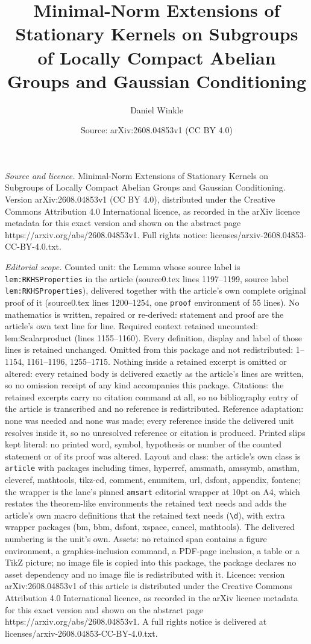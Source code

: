 \documentclass[10pt,a4paper]{amsart}
\title[Minimal-Norm Extensions of Stationary Kernels on Subgroups o]{Minimal-Norm Extensions of Stationary Kernels on Subgroups of Locally Compact Abelian Groups and Gaussian Conditioning}
\author{Daniel Winkle}
\date{Source: arXiv:2608.04853v1 (CC BY 4.0)}
\begin{document}
\maketitle

\noindent\emph{Source and licence.} Minimal-Norm Extensions of Stationary Kernels on Subgroups of Locally Compact Abelian Groups and Gaussian Conditioning. Version arXiv:2608.04853v1 (CC BY 4.0), distributed under the Creative Commons Attribution 4.0 International licence, as recorded in the arXiv licence metadata for this exact version and shown on the abstract page https://arxiv.org/abs/2608.04853v1. Full rights notice: licenses/arxiv-2608.04853-CC-BY-4.0.txt.\par\smallskip

\noindent\textit{Editorial scope.} Counted unit: the Lemma whose source label is \texttt{lem:RKHSProperties} in the article (source0.tex lines 1197--1199, source label \texttt{lem:RKHSProperties}), delivered together with the article's own complete original proof of it (source0.tex lines 1200--1254, one \texttt{proof} environment of 55 lines). No mathematics is written, repaired or re-derived: statement and proof are the article's own text line for line. Required context retained uncounted: lem:Scalarproduct (lines 1155--1160). Every definition, display and label of those lines is retained unchanged. Omitted from this package and not redistributed: 1--1154, 1161--1196, 1255--1715. Nothing inside a retained excerpt is omitted or altered: every retained body is delivered exactly as the article's lines are written, so no omission receipt of any kind accompanies this package. Citations: the retained excerpts carry no citation command at all, so no bibliography entry of the article is transcribed and no reference is redistributed. Reference adaptation: none was needed and none was made; every reference inside the delivered unit resolves inside it, so no unresolved reference or citation is produced. Printed slips kept literal: no printed word, symbol, hypothesis or number of the counted statement or of its proof was altered. Layout and class: the article's own class is \texttt{article} with packages including times, hyperref, amsmath, amssymb, amsthm, cleveref, mathtools, tikz-cd, comment, enumitem, url, dsfont, appendix, fontenc; the wrapper is the lane's pinned \texttt{amsart} editorial wrapper at 10pt on A4, which restates the theorem-like environments the retained text needs and adds the article's own macro definitions that the retained text needs (\texttt{\textbackslash d}), with extra wrapper packages (bm, bbm, dsfont, xspace, cancel, mathtools). The delivered numbering is the unit's own. Assets: no retained span contains a figure environment, a graphics-inclusion command, a PDF-page inclusion, a table or a TikZ picture; no image file is copied into this package, the package declares no asset dependency and no image file is redistributed with it. Licence: version arXiv:2608.04853v1 of this article is distributed under the Creative Commons Attribution 4.0 International licence, as recorded in the arXiv licence metadata for this exact version and shown on the abstract page https://arxiv.org/abs/2608.04853v1. A full rights notice is delivered at licenses/arxiv-2608.04853-CC-BY-4.0.txt. 
\end{document}
